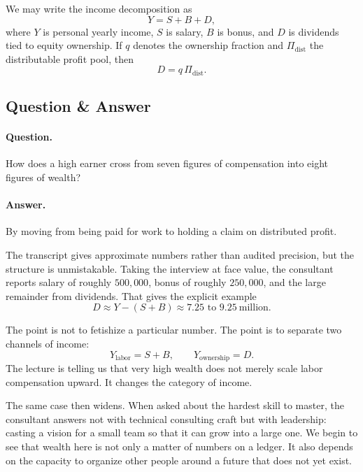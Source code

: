 We may write the income decomposition as
\begin{equation}
Y = S + B + D,
\end{equation}
where \(Y\) is personal yearly income, \(S\) is salary, \(B\) is bonus, and \(D\) is dividends tied to equity ownership. If \(q\) denotes the ownership fraction and \(\Pi_{\mathrm{dist}}\) the distributable profit pool, then
\begin{equation}
D = q\,\Pi_{\mathrm{dist}}.
\end{equation}

\subsection{Question \& Answer}

\paragraph{Question.} How does a high earner cross from seven figures of compensation into eight figures of wealth?

\paragraph{Answer.} By moving from being paid for work to holding a claim on distributed profit.

The transcript gives approximate numbers rather than audited precision, but the structure is unmistakable. Taking the interview at face value, the consultant reports salary of roughly \(500{,}000\), bonus of roughly \(250{,}000\), and the large remainder from dividends. That gives the explicit example
\begin{equation}
D \approx Y - (S+B) \approx 7.25 \text{ to } 9.25 \ \text{million}.
\end{equation}

The point is not to fetishize a particular number. The point is to separate two channels of income:
\begin{equation}
Y_{\mathrm{labor}} = S+B,
\qquad
Y_{\mathrm{ownership}} = D.
\end{equation}
The lecture is telling us that very high wealth does not merely scale labor compensation upward. It changes the category of income.

The same case then widens. When asked about the hardest skill to master, the consultant answers not with technical consulting craft but with leadership: casting a vision for a small team so that it can grow into a large one. We begin to see that wealth here is not only a matter of numbers on a ledger. It also depends on the capacity to organize other people around a future that does not yet exist.

